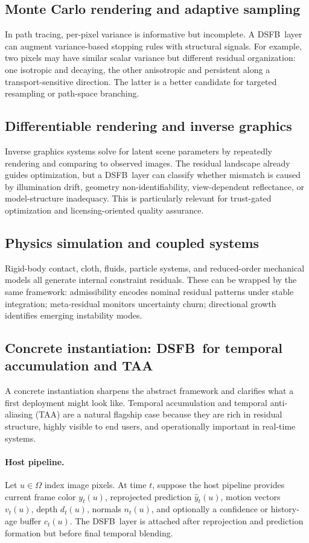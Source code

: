 \documentclass[11pt]{article}
\newcommand{\dsfb}{\textsc{DSFB}}
\theoremstyle{definition}
\theoremstyle{plain}
\begin{document}
\subsection{Monte Carlo rendering and adaptive sampling}
In path tracing, per-pixel variance is informative but incomplete. A \dsfb\ layer can augment variance-based stopping rules with structural signals. For example, two pixels may have similar scalar variance but different residual organization: one isotropic and decaying, the other anisotropic and persistent along a transport-sensitive direction. The latter is a better candidate for targeted resampling or path-space branching.

\subsection{Differentiable rendering and inverse graphics}
Inverse graphics systems solve for latent scene parameters by repeatedly rendering and comparing to observed images. The residual landscape already guides optimization, but a \dsfb\ layer can classify whether mismatch is caused by illumination drift, geometry non-identifiability, view-dependent reflectance, or model-structure inadequacy. This is particularly relevant for trust-gated optimization and licensing-oriented quality assurance.

\subsection{Physics simulation and coupled systems}
Rigid-body contact, cloth, fluids, particle systems, and reduced-order mechanical models all generate internal constraint residuals. These can be wrapped by the same framework: admissibility encodes nominal residual patterns under stable integration; meta-residual monitors uncertainty churn; directional growth identifies emerging instability modes.

\subsection{Concrete instantiation: \dsfb\ for temporal accumulation and TAA}
A concrete instantiation sharpens the abstract framework and clarifies what a first deployment might look like. Temporal accumulation and temporal anti-aliasing (TAA) are a natural flagship case because they are rich in residual structure, highly visible to end users, and operationally important in real-time systems.

\paragraph{Host pipeline.}
Let $u \in \Omega$ index image pixels. At time $t$, suppose the host pipeline provides current frame color $y_t(u)$, reprojected prediction $\hat y_t(u)$, motion vectors $v_t(u)$, depth $d_t(u)$, normals $n_t(u)$, and optionally a confidence or history-age buffer $c_t(u)$. The \dsfb\ layer is attached after reprojection and prediction formation but before final temporal blending.
\end{document}
